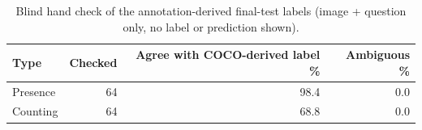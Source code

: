 \begin{table}[t]
\centering
\small
\caption{Blind hand check of the annotation-derived final-test labels (image + question only, no label or prediction shown).}
\label{tab:t2_t11_label_audit}
\begin{tabular}{lrrr}
\toprule
Type & Checked & Agree with COCO-derived label \% & Ambiguous \% \\
\midrule
Presence & 64 & 98.4 & 0.0 \\
Counting & 64 & 68.8 & 0.0 \\
\bottomrule
\end{tabular}
\end{table}
